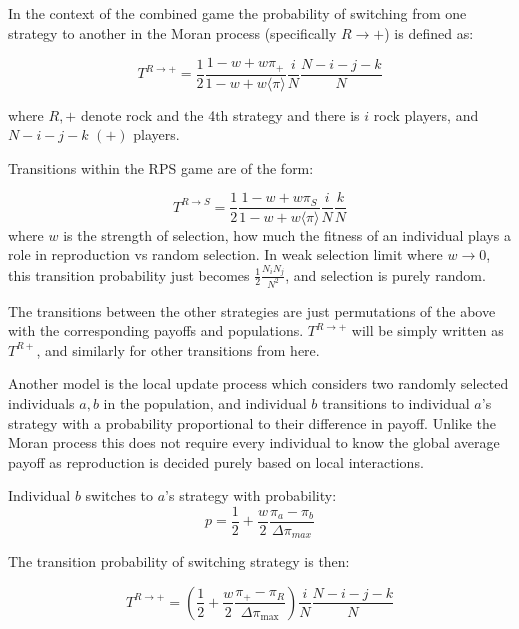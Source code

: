 \documentclass[%
 reprint,
 amsmath,amssymb,
 aps,
]{revtex4-2}
\begin{document}
In the context of the combined game the probability of switching from one strategy
to another in the Moran process (specifically $R \rightarrow +$) is defined as:

\begin{equation}
    T^{R \rightarrow +} = \frac{1}{2} \frac{1 - w + w \pi_+}{1 - w + w \langle \pi \rangle} \frac{i}{N} \frac{N - i - j - k}{N}
\end{equation}

where $R,+$ denote rock and the 4th strategy and there is $i$ rock players, 
and $N-i-j-k$ $(+)$ players.

Transitions within the RPS game are of the form:

\begin{equation}
    T^{R \rightarrow S} = \frac{1}{2} \frac{1 - w + w \pi_S}{1 - w + w \langle \pi \rangle} \frac{i}{N} \frac{k}{N}
\end{equation}  
where $w$ is the strength of selection, how much the fitness of an individual 
plays a role in reproduction vs random selection. In weak selection 
limit where $w \rightarrow 0$, this transition probability just becomes 
$\frac{1}{2}\frac{N_i N_j}{N^2}$, and selection is purely random.

The transitions between the other strategies are just permutations of the above
with the corresponding payoffs and populations. $T^{R \rightarrow +}$ will be 
simply written as $T^{R+}$, and similarly for other transitions from here.


Another model is the local update process which considers two 
randomly selected individuals $a,b$ in the population, and individual
$b$ transitions to individual $a$'s strategy with a probability proportional to 
their difference in payoff. Unlike the Moran process this does not require
every individual to know the global average payoff as reproduction 
is decided purely based on local interactions.


Individual $b$ switches to $a$'s strategy with probability:
\begin{equation}
p = \frac{1}{2} + \frac{w}{2} \frac{\pi_a - \pi_b}{\Delta \pi_{max}}
\end{equation}

The transition probability of switching strategy is then:

\begin{equation}
  T^{R \rightarrow +} = \left (\frac{1}{2} + \frac{w}{2} \frac{\pi_+ - \pi_R}{\Delta \pi_{\text{max}}} \right ) \frac{i}{N} \frac{N - i - j - k}{N}
\end{equation}
\end{document}
